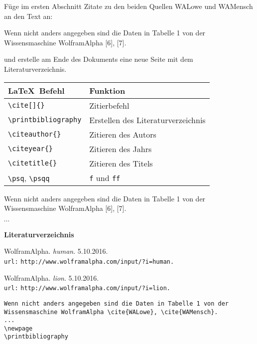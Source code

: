 \begin{frame}[fragile]
	\begin{Aufgabe}
		Füge im ersten Abschnitt  Zitate zu den beiden Quellen \textrm{WALowe} und \textrm{WAMensch} an den Text an:
		\begin{outputbox}
			Wenn nicht anders angegeben sind die Daten in Tabelle 1 von der Wissensmaschine WolframAlpha [6], [7].
		\end{outputbox}
		und erstelle am Ende des Dokuments eine neue Seite mit dem Literaturverzeichnis.
	\end{Aufgabe}
	\btVFill\Befehle
	\begin{center}
		\begin{tabular}{ll}
			\toprule
			\LaTeX\ Befehl							&	Funktion					\\ \midrule
			\lstinline|\cite[]{}|					&	Zitierbefehl\\
			\lstinline|\printbibliography|			&	Erstellen des Literaturverzeichnis\\
			\lstinline|\citeauthor{}|				&	Zitieren des Autors \\
			\lstinline|\citeyear{}|					&	Zitieren des Jahrs \\
			\lstinline|\citetitle{}|				&	Zitieren des Titels \\
			\lstinline|\psq|, \lstinline|\psqq|		&	\texttt{f} und \texttt{ff} \\
			\bottomrule
		\end{tabular}
	\end{center}
	\vspace{0.1cm}
\end{frame}
\begin{frame}[fragile]
	\Losung
	\begin{outputbox}
		Wenn nicht anders angegeben sind die Daten in Tabelle 1 von der Wissensmaschine WolframAlpha [6], [7].
	\end{outputbox}
	\linebreakrule\vspace{-0.3cm}
	$\cdots$
	\linebreakrule
	\begin{outputbox}
		{\LARGE \textbf{Literaturverzeichnis}}
		
		\makebox[1cm]{$[6]$} WolframAlpha. \textit{human}. 5.10.2016.\\
		\makebox[1cm]{} \texttt{url:} \lstinline|http://www.wolframalpha.com/input/?i=human.|
		
		\makebox[1cm]{$[7]$} WolframAlpha. \textit{lion}. 5.10.2016.\\
		\makebox[1cm]{} \texttt{url:} \lstinline|http://www.wolframalpha.com/input/?i=lion.|
	\end{outputbox}
	\Code
	\begin{lstlisting}
Wenn nicht anders angegeben sind die Daten in Tabelle 1 von der Wissensmaschine WolframAlpha \cite{WALowe}, \cite{WAMensch}.
...
\newpage
\printbibliography
	\end{lstlisting}
\end{frame}
